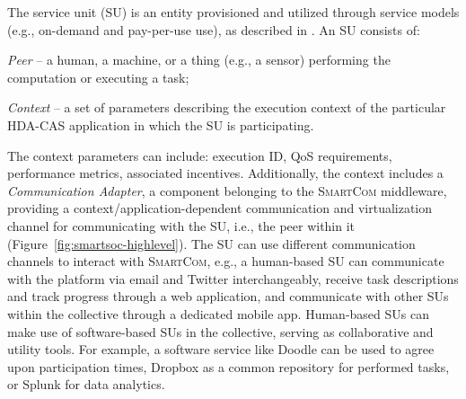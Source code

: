 \documentclass{llncs}
\newcommand{\mdl}{\textsc{SmartCom}}
\begin{document}
      The service unit (SU) is an entity provisioned and utilized through service models (e.g., on-demand and pay-per-use use), as described in \cite{truongijcis}. An SU consists of:
        \begin{inparaenum}[\itshape i)]
          \item \textit{Peer} -- a human, a machine, or a thing (e.g., a sensor) performing the computation or executing a task;
          \item \textit{Context} -- a set of parameters describing the execution context of the particular HDA-CAS application in which the SU is participating. 
        \end{inparaenum}
      The context parameters can include: execution ID, QoS requirements, performance metrics, associated incentives. Additionally, the context includes a \emph{Communication Adapter}, a component belonging to the \mdl{} middleware, providing a context/application-dependent communication and virtualization channel for communicating with the SU, i.e., the peer within it (Figure~\ref{fig:smartsoc-highlevel}).
      The SU can use different communication channels to interact with \mdl{}, e.g., a human-based SU can communicate with the platform via email and Twitter interchangeably, receive task descriptions and track progress through a web application, and communicate with other SUs within the collective through a dedicated mobile app. Human-based SUs can make use of software-based SUs in the collective, serving as collaborative and utility tools. For example, a software service like Doodle can be used to agree upon participation times, Dropbox as a common repository for performed tasks, or Splunk for data analytics.
\end{document}
